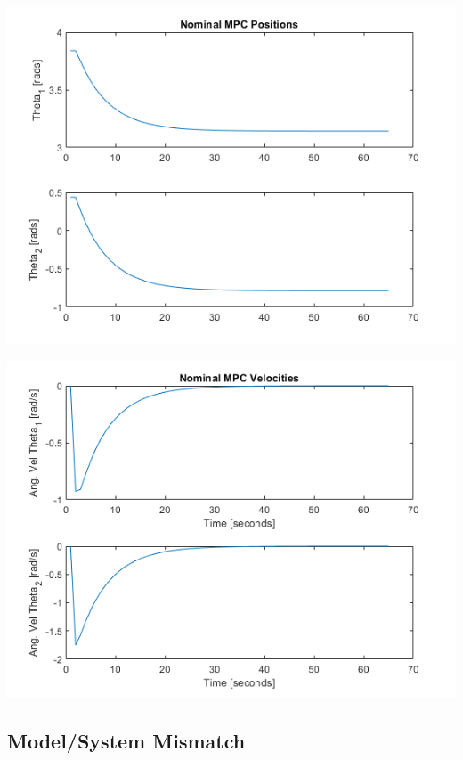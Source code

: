 \documentclass[journal]{IEEEtran}
\begin{document}
\includegraphics[scale = 0.5]{../images/Nominal_MPC/T4_X_init_220_25_0_0_X_ref_180_n45_0_0/AngularPositions}


\includegraphics[scale = 0.5]{../images/Nominal_MPC/T4_X_init_220_25_0_0_X_ref_180_n45_0_0/AngularVelocities}





\subsection{Model/System Mismatch}

\subsection{}
\end{document}
